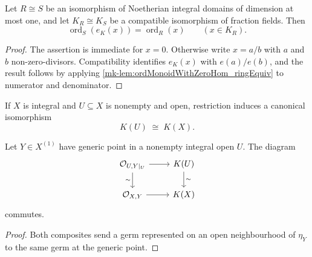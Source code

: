 \begin{lemma}
  \label{mk-lem:ordFrac_ringEquiv}
  \leanok


  Let \(R\cong S\) be an isomorphism of Noetherian integral domains of
  dimension at most one, and let \(K_R\cong K_S\) be a compatible
  isomorphism of fraction fields.  Then
  \[
    \operatorname{ord}_{S}(e_K(x))
      =\operatorname{ord}_{R}(x)
    \qquad (x\in K_R).
  \]
\end{lemma}
\begin{proof}
  \leanok
  The assertion is immediate for \(x=0\).  Otherwise write \(x=a/b\) with
  \(a\) and \(b\) non-zero-divisors.  Compatibility identifies
  \(e_K(x)\) with \(e(a)/e(b)\), and the result follows by applying
  \ref{mk-lem:ordMonoidWithZeroHom_ringEquiv} to numerator and denominator.
\end{proof}

\begin{definition}
  \label{mk-def:functionFieldIso}
  \leanok

  If \(X\) is integral and \(U\subseteq X\) is nonempty and open, restriction
  induces a canonical isomorphism
  \[
    K(U)\;\cong\;K(X).
  \]
\end{definition}

\begin{lemma}
  \label{mk-lem:functionFieldIso_compat}
  \leanok


  Let \(Y\in X^{(1)}\) have generic point in a nonempty integral open
  \(U\).  The diagram
  \[
  \begin{tikzcd}
    \mathcal O_{U,Y|_U} \arrow[r] \arrow[d, "\sim"']
      & K(U) \arrow[d, "\sim"] \\
    \mathcal O_{X,Y} \arrow[r] & K(X)
  \end{tikzcd}
  \]
  commutes.
\end{lemma}
\begin{proof}
  \leanok
  Both composites send a germ represented on an open neighbourhood of
  \(\eta_Y\) to the same germ at the generic point.
\end{proof}

